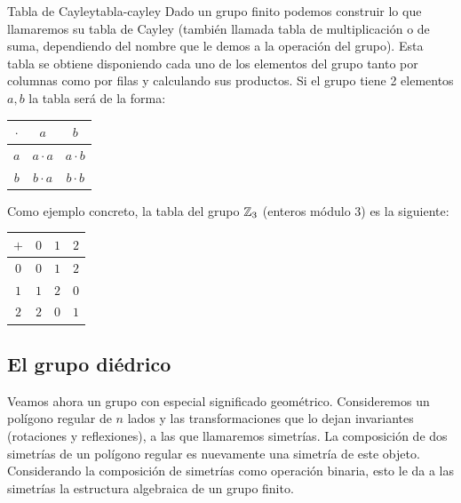 \begin{example}{Tabla de Cayley}{tabla-cayley}
    Dado un grupo finito podemos construir lo que llamaremos su tabla de Cayley (también llamada tabla de multiplicación o de suma, dependiendo del nombre que le demos a la operación del grupo). Esta tabla se obtiene disponiendo cada uno de los elementos del grupo tanto por columnas como por filas y calculando sus productos. Si el grupo tiene 2 elementos $a,b$ la tabla será de la forma:
    \begin{center}
        \begin{tabular}{c | c | c}
            $\cdot$ & $a$ & $b$ \\
            \hline
            $a$ & $a \cdot a$ & $a \cdot b$  \\ 
            \hline
            $b$ & $b \cdot a$ & $b \cdot b$ \\
            \hline
        \end{tabular}
    \end{center}

    Como ejemplo concreto, la tabla del grupo $\mathbb{Z}_3$ (enteros módulo 3) es la siguiente:
    \vspace{10pt}
    \begin{center}
        \begin{tabular}{c | c | c | c}
            $+$ & $0$ & $1$ & $2$ \\
            \hline
            $0$ & $0$ & $1$ & $2$ \\ 
            \hline
            $1$ & $1$ & $2$ & $0$ \\ 
            \hline
            $2$ & $2$ & $0$ & $1$ \\ 
            \hline
        \end{tabular}
    \end{center}
\end{example}

\subsection{El grupo diédrico}

Veamos ahora un grupo con especial significado geométrico. Consideremos un polígono regular de \(n\) lados y las transformaciones que lo dejan invariantes (rotaciones y reflexiones), a las que llamaremos simetrías. La composición de dos simetrías de un polígono regular es nuevamente una simetría de este objeto. Considerando la composición de simetrías como operación binaria, esto le da a las simetrías la estructura algebraica de un grupo finito.

